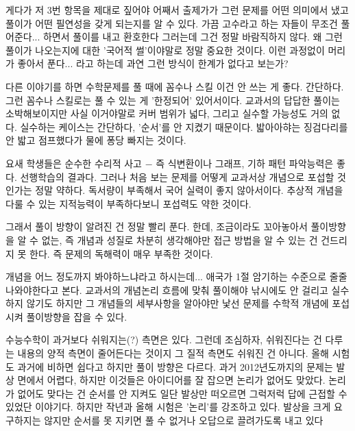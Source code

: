 게다가 저 3번 항목을 제대로 짚어야
어째서 출제가가 그런 문제를 어떤 의미에서 냈고
풀이가 어떤 필연성을 갖게 되는지를 알 수 있다.
가끔 고수라고 하는 자들이 무조건 풀어준다...  하면서 풀이를 내고 환호한다 그러는데 그건 정말 바람직하지 않다.
왜 그런 풀이가 나오는지에 대한 '국어적 썰'이야말로 정말 중요한 것이다.
이런 과정없이 머리가 좋아서 푼다... 라고 하는데 과연 그런 방식이 한계가 없다고 보는가?
\vspace{5mm}

다른 이야기를 하면 수학문제를 풀 때에 꼼수나 스킬 이건 안 쓰는 게 좋다.
간단하다. 그런 꼼수나 스킬로는 풀 수 있는 게 '한정되어' 있어서이다.
교과서의 답답한 풀이는 소박해보이지만 사실 이거야말로 커버 범위가 넓다, 그리고 실수할 가능성도 거의 없다.
실수하는 케이스는 간단하다, '순서'를 안 지켰기 때문이다. 밟아아햐는 징검다리를 안 밟고 점프했다가 물에 퐁당 빠지는 것이다.
\vspace{5mm}

요새 학생들은 순수한 수리적 사고 $-$ 즉 식변환이나 그래프, 기하 패턴 파악능력은 좋다. 선행학습의 결과다.
그러나 처음 보는 문제를 어떻게 교과서상 개념으로 포섭할 것인가는 정말 약하다.
독서량이 부족해서 국어 실력이 좋지 않아서이다. 추상적 개념을 다룰 수 있는 지적능력이 부족하다보니 포섭력도 약한 것이다.
\vspace{5mm}

그래서 풀이 방향이 알려진 건 정말 빨리 푼다. 한데, 조금이라도 꼬아놓아서 풀이방향을 알 수 없는,
즉 개념과 성질로 차분히 생각해야만 접근 방법을 알 수 있는 건 건드리지 못 한다.
즉 문제의 독해력이 매우 부족한 것이다.
\vspace{5mm}

개념을 어느 정도까지 봐야하느냐라고 하시는데... 애국가 1절 암기하는 수준으로 줄줄 나와야한다고 본다.
교과서의 개념논리 흐름에 맞춰 풀이해야 낚시에도 안 걸리고 실수하지 않기도 하지만
그 개념들의 세부사항을 알아야만 낯선 문제를 수학적 개념에 포섭시켜 풀이방향을 잡을 수 있다.
\vspace{5mm}

수능수학이 과거보다 쉬워지는(?) 측면은 있다. 그런데 조심하자, 쉬워진다는 건 다루는 내용의 양적 측면이 줄어든다는 것이지
그 질적 측면도 쉬워진 건 아니다. 올해 시험도 과거에 비하면 쉽다고 하지만 풀이 방향은 다르다.
과거 2012년도까지의 문제는 발상 면에서 어렵다, 하지만 이것들은 아이디어를 잘 잡으면 논리가 없어도 맞았다.
논리가 없어도 맞다는 건 순서를 안 지켜도 일단 발상만 떠오르면 그럭저럭 답에 근접할 수 있었단 이야기다.
하지만 작년과 올해 시험은 '논리'를 강조하고 있다. 발상을 크게 요구하지는 않지만 순서를 못 지키면 풀 수 없거나
오답으로 끌려가도록 내고 있다
\vspace{5mm}



